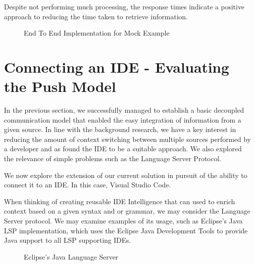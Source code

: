 Despite not performing much processing, the response times indicate a positive approach to reducing the time taken to retrieve information.



\begin{figure}[h!]
	\centering
	
	\caption{End To End Implementation for Mock Example}
	\label{fig:e2eMockClass}
\end{figure}

\section{Connecting an IDE - Evaluating the Push Model}

In the previous section, we successfully managed to establish a basic decoupled communication model that enabled the easy integration of information from a given source. In line with the background research, we have a key interest in reducing the amount of context switching between multiple sources performed by a developer and as found the IDE to be a suitable approach. We also explored the relevance of simple problems such as the Language Server Protocol. 

We now explore the extension of our current solution in pursuit of the ability to connect it to an IDE. In this case, Visual Studio Code.  

When thinking of creating reusable IDE Intelligence that can used to enrich context based on a given syntax and or grammar, we may consider the Language Server protocol. We may examine examples of its usage, such as Eclipse's Java LSP implementation, which uses the Eclipse Java Development Tools to provide Java support to all LSP supporting IDEs.

\begin{figure}[h!]
	
	
	\caption{Eclipse's Java Language Server}
	
\end{figure}


